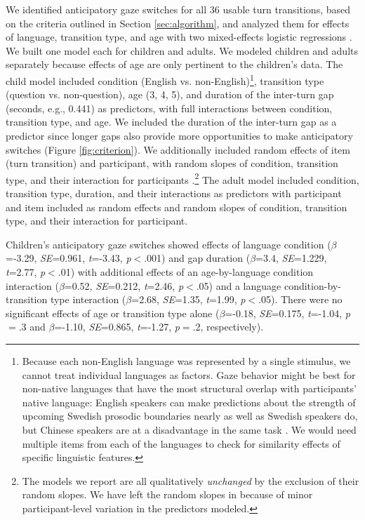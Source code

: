 \documentclass[authoryear, 12pt]{elsarticle}
\begin{document}
We identified anticipatory gaze switches for all 36 usable turn transitions, based on the criteria outlined in Section \ref{sec:algorithm}, and analyzed them for effects of language, transition type, and age with two mixed-effects logistic regressions \citep{lme4, R}. We built one model each for children and adults. We modeled children and adults separately because effects of age are only pertinent to the children's data. The child model included condition (English vs. non-English)\footnote{Because each non-English language was represented by a single stimulus, we cannot treat individual languages as factors. Gaze behavior might be best for non-native languages that have the most structural overlap with participants' native language: English speakers can make predictions about the strength of upcoming Swedish prosodic boundaries nearly as well as Swedish speakers do, but Chinese speakers are at a disadvantage in the same task \citep{carlson2005}. We would need multiple items from each of the languages to check for similarity effects of specific linguistic features.}, transition type (question vs. non-question), age (3, 4, 5), and duration of the inter-turn gap (seconds, e.g., 0.441) as predictors, with full interactions between condition, transition type, and age.  We included the duration of the inter-turn gap as a predictor since longer gaps also provide more opportunities to make anticipatory switches (Figure \ref{fig:criterion}). We additionally included random effects of item (turn transition) and participant, with random slopes of condition, transition type, and their interaction for participants \citep{barr2013}.\footnote{The models we report are all qualitatively \textit{unchanged} by the exclusion of their random slopes. We have left the random slopes in because of minor participant-level variation in the predictors modeled.} The adult model included condition, transition type, duration, and their interactions as predictors with participant and item included as random effects and random slopes of condition, transition type, and their interaction for participant.

Children's anticipatory gaze switches showed effects of language condition (\textit{$\beta$}=-3.29, \textit{SE}=0.961, \textit{t}=-3.43, \textit{p}$<$.001) and gap duration (\textit{$\beta$}=3.4, \textit{SE}=1.229, \textit{t}=2.77, \textit{p}$<$.01) with additional effects of an age-by-language condition interaction (\textit{$\beta$}=0.52, \textit{SE}=0.212, \textit{t}=2.46, \textit{p}$<$.05) and a language condition-by-transition type interaction (\textit{$\beta$}=2.68, \textit{SE}=1.35, \textit{t}=1.99, \textit{p}$<$.05). There were no significant effects of age or transition type alone (\textit{$\beta$}=-0.18, \textit{SE}=0.175, \textit{t}=-1.04, \textit{p}$=$.3 and \textit{$\beta$}=-1.10, \textit{SE}=0.865, \textit{t}=-1.27, \textit{p}$=$.2, respectively). 
\end{document}
